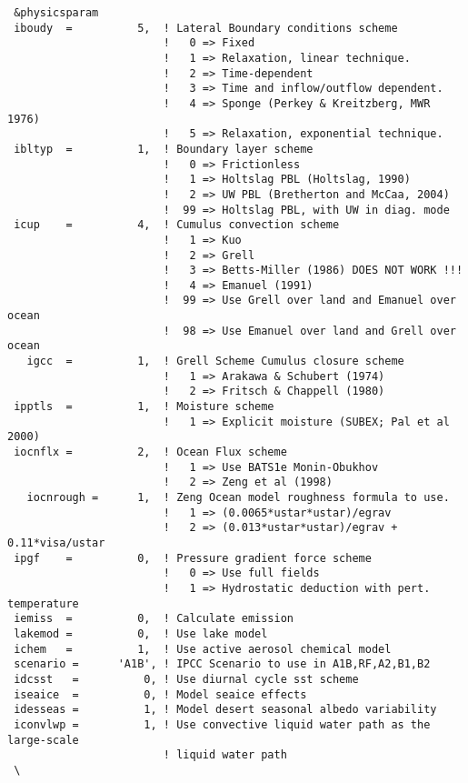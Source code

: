 {\footnotesize
\begin{Verbatim}
 &physicsparam
 iboudy  =          5,  ! Lateral Boundary conditions scheme
                        !   0 => Fixed
                        !   1 => Relaxation, linear technique.
                        !   2 => Time-dependent
                        !   3 => Time and inflow/outflow dependent.
                        !   4 => Sponge (Perkey & Kreitzberg, MWR 1976)
                        !   5 => Relaxation, exponential technique.
 ibltyp  =          1,  ! Boundary layer scheme
                        !   0 => Frictionless
                        !   1 => Holtslag PBL (Holtslag, 1990)
                        !   2 => UW PBL (Bretherton and McCaa, 2004)
                        !  99 => Holtslag PBL, with UW in diag. mode
 icup    =          4,  ! Cumulus convection scheme
                        !   1 => Kuo
                        !   2 => Grell
                        !   3 => Betts-Miller (1986) DOES NOT WORK !!!
                        !   4 => Emanuel (1991)
                        !  99 => Use Grell over land and Emanuel over ocean
                        !  98 => Use Emanuel over land and Grell over ocean
   igcc  =          1,  ! Grell Scheme Cumulus closure scheme
                        !   1 => Arakawa & Schubert (1974)
                        !   2 => Fritsch & Chappell (1980)
 ipptls  =          1,  ! Moisture scheme
                        !   1 => Explicit moisture (SUBEX; Pal et al 2000)
 iocnflx =          2,  ! Ocean Flux scheme
                        !   1 => Use BATS1e Monin-Obukhov
                        !   2 => Zeng et al (1998)
   iocnrough =      1,  ! Zeng Ocean model roughness formula to use.
                        !   1 => (0.0065*ustar*ustar)/egrav
                        !   2 => (0.013*ustar*ustar)/egrav + 0.11*visa/ustar
 ipgf    =          0,  ! Pressure gradient force scheme
                        !   0 => Use full fields
                        !   1 => Hydrostatic deduction with pert. temperature
 iemiss  =          0,  ! Calculate emission
 lakemod =          0,  ! Use lake model
 ichem   =          1,  ! Use active aerosol chemical model
 scenario =      'A1B', ! IPCC Scenario to use in A1B,RF,A2,B1,B2
 idcsst   =          0, ! Use diurnal cycle sst scheme
 iseaice  =          0, ! Model seaice effects
 idesseas =          1, ! Model desert seasonal albedo variability
 iconvlwp =          1, ! Use convective liquid water path as the large-scale
                        ! liquid water path
 \
\end{Verbatim}
}

